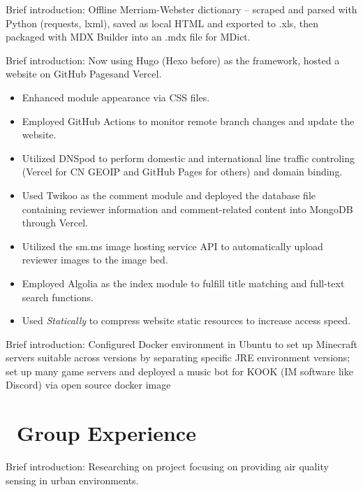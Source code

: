 \documentclass[12pt]{resume}
\begin{document}
Brief introduction: Offline Merriam-Webster dictionary -- scraped and parsed with Python (requests, lxml), saved as local HTML and exported to .xls, then packaged with MDX Builder into an .mdx file for MDict.

Brief introduction: Now using Hugo (Hexo before) as the framework, hosted a website on GitHub Pagesand Vercel.
\begin{itemize}
  \item Enhanced module appearance via CSS files.
  \item Employed GitHub Actions to monitor remote branch changes and update the website.
  \item Utilized DNSpod to perform domestic and international line traffic controling (Vercel for CN GEOIP and GitHub Pages for others) and domain binding.
  \item Used Twikoo as the comment module and deployed the database file containing reviewer information and comment-related content into MongoDB through Vercel.
  \item Utilized the sm.ms image hosting service API to automatically upload reviewer images to the image bed.
  \item Employed Algolia as the index module to fulfill title matching and full-text search functions.
  \item Used \textit{Statically} to compress website static resources to increase access speed.
\end{itemize}

Brief introduction: Configured Docker environment in Ubuntu to set up Minecraft servers suitable across versions by separating specific JRE environment versions; set up many game servers and deployed a music bot for KOOK (IM software like Discord) via open source docker image

\section{\texorpdfstring{\textbf{\faUserGroup}\ Group Experience}{Group Experience}}
Brief introduction: Researching on project focusing on providing air quality sensing in urban environments.
\end{document}
